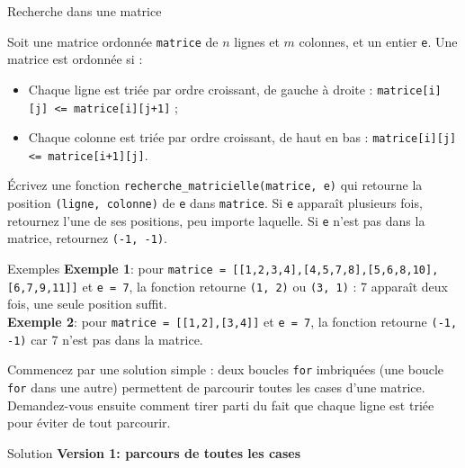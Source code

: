 \begin{Exercice}[20 minutes] [Python] Recherche dans une matrice %
    
    Soit une matrice ordonnée \lstinline{matrice} de $n$ lignes et $m$ colonnes, et un entier \lstinline{e}. Une matrice est ordonnée si :
    \begin{itemize}
        \item Chaque ligne est triée par ordre croissant, de gauche à droite : \lstinline{matrice[i][j] <= matrice[i][j+1]} ;
        \item Chaque colonne est triée par ordre croissant, de haut en bas : \lstinline{matrice[i][j] <= matrice[i+1][j]}.
    \end{itemize}

    Écrivez une fonction \lstinline{recherche_matricielle(matrice, e)} qui retourne la position \lstinline{(ligne, colonne)} de \lstinline{e} dans \lstinline{matrice}. Si \lstinline{e} apparaît plusieurs fois, retournez l'une de ses positions, peu importe laquelle. Si \lstinline{e} n'est pas dans la matrice, retournez \lstinline{(-1, -1)}.\\

    \begin{Example}{\faTerminal \quad Exemples}
        \textbf{Exemple 1}\!\!\!\!: pour \lstinline{matrice = [[1,2,3,4],[4,5,7,8],[5,6,8,10],[6,7,9,11]]} et \lstinline{e = 7}, la fonction retourne \lstinline{(1, 2)} ou \lstinline{(3, 1)} : 7 apparaît deux fois, une seule position suffit.\\

        \textbf{Exemple 2}\!: pour \lstinline{matrice = [[1,2],[3,4]]} et \lstinline{e = 7}, la fonction retourne \lstinline{(-1, -1)} car 7 n'est pas dans la matrice.
    \end{Example}

    

    \begin{conseil}
    Commencez par une solution simple : deux boucles \lstinline{for} imbriquées (une boucle \lstinline{for} dans une autre) permettent de parcourir toutes les cases d'une matrice. Demandez-vous ensuite comment tirer parti du fait que chaque ligne est triée pour éviter de tout parcourir.
    \end{conseil}

    \ifShowSolution
    \begin{Solutions}{\faTerminal \enskip Solution}
        \textbf{Version 1: parcours de toutes les cases}
        


\end{Solutions}
\end{Exercice}
